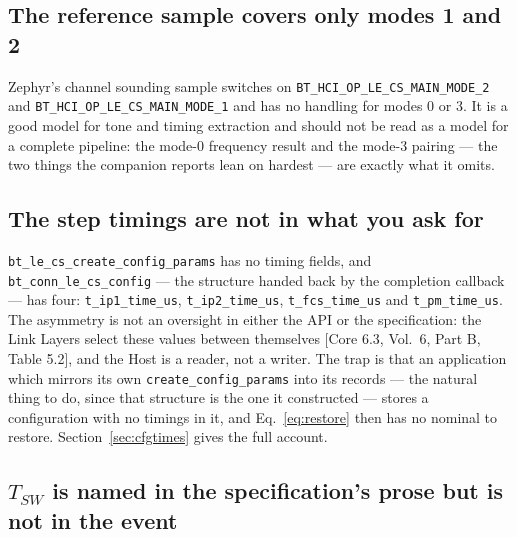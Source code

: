 \documentclass[11pt,a4paper]{article}
\newcommand{\code}[1]{\texttt{\small #1}}
\newcommand{\core}[1]{\textcolor{rulegrey}{\small[Core 6.3, #1]}}
\newcommand{\Tsw}{\ensuremath{T_{SW}}}
\begin{document}
\subsection{The reference sample covers only modes 1 and 2}

Zephyr's channel sounding sample switches on \code{BT\_\allowbreak{}HCI\_\allowbreak{}OP\_\allowbreak{}LE\_\allowbreak{}CS\_\allowbreak{}MAIN\_\allowbreak{}MODE\_\allowbreak{}2} and
\code{BT\_\allowbreak{}HCI\_\allowbreak{}OP\_\allowbreak{}LE\_\allowbreak{}CS\_\allowbreak{}MAIN\_\allowbreak{}MODE\_\allowbreak{}1} and has no handling for modes 0 or 3. It is a good model
for tone and timing extraction and should not be read as a model for a complete pipeline: the mode-0
frequency result and the mode-3 pairing --- the two things the companion reports lean on hardest ---
are exactly what it omits.

\subsection{The step timings are not in what you ask for}

\code{bt\_\allowbreak{}le\_\allowbreak{}cs\_\allowbreak{}create\_\allowbreak{}config\_\allowbreak{}params} has no timing fields, and
\code{bt\_\allowbreak{}conn\_\allowbreak{}le\_\allowbreak{}cs\_\allowbreak{}config} --- the structure handed back by the completion callback ---
has four: \code{t\_\allowbreak{}ip1\_\allowbreak{}time\_\allowbreak{}us}, \code{t\_\allowbreak{}ip2\_\allowbreak{}time\_\allowbreak{}us},
\code{t\_\allowbreak{}fcs\_\allowbreak{}time\_\allowbreak{}us} and \code{t\_\allowbreak{}pm\_\allowbreak{}time\_\allowbreak{}us}. The asymmetry is not an oversight in
either the API or the specification: the Link Layers select these values between themselves
\core{Vol.\ 6, Part B, Table 5.2}, and the Host is a reader, not a writer. The trap is that an
application which mirrors its own \code{create\_\allowbreak{}config\_\allowbreak{}params} into its records --- the
natural thing to do, since that structure is the one it constructed --- stores a configuration with
no timings in it, and Eq.~\eqref{eq:restore} then has no nominal to restore. Section~\ref{sec:cfgtimes}
gives the full account.

\subsection{\texorpdfstring{$\Tsw$}{T\_SW} is named in the specification's prose but is not in the event}
\end{document}
